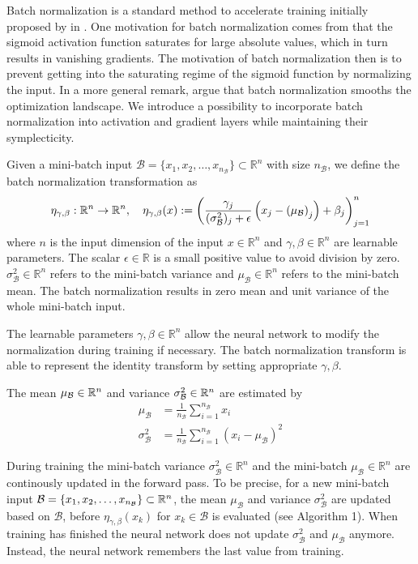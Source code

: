 \documentclass[twoside,a4paper]{article}
\begin{document}
Batch normalization is a standard method to accelerate training initially proposed by
\citeauthor{batchnorm-ioffe15} in \cite{batchnorm-ioffe15}.
One motivation for batch normalization comes from that the sigmoid activation function saturates 
for large absolute values, which in turn results in vanishing gradients. The motivation of batch
normalization then is to prevent getting into the saturating regime of the sigmoid function
by normalizing the input. In a more general remark, \citet{Santurkar2018} argue that
batch normalization smooths the optimization landscape.
We introduce a possibility to incorporate batch normalization
into activation and gradient layers while maintaining their symplecticity.

Given a mini-batch input $\mathcal{B} = \{  x_1, x_2, \dots, x_{n_{\mathcal{B}}} \} \subset \mathbb{R}^{n}$ 
with size $n_{\mathcal{B}}$, we define the batch normalization transformation as
\begin{equation*}
	\eta_{\gamma, \beta} : \mathbb{R}^n \to \mathbb{R}^n,\quad
	\eta_{\gamma, \beta}(x) 
	:= \left( \frac{\gamma_j}{(\sigma^2_\mathcal{B})_j + \epsilon} 
	\left( x_j - \left( \mu_\mathcal{B} \right)_j \right) + \beta_j \right)_{j=1}^n
\end{equation*}
where $n$ is the input dimension of the input $x \in \mathbb{R}^n$ and $\gamma, \beta \in \mathbb{R}^{n}$ 
are learnable parameters.
The scalar $\epsilon \in \mathbb{R}$ is a small positive value to avoid division by zero.
$\sigma^2_\mathcal{B} \in \mathbb{R}^{n}$ refers to the mini-batch variance and
$\mu_\mathcal{B} \in \mathbb{R}^{n}$ refers to the mini-batch mean. The batch normalization results 
in zero mean and unit variance of the whole mini-batch input.

The learnable parameters $\gamma, \beta \in \mathbb{R}^{n}$ allow the neural network to modify
the normalization during training if necessary. The batch normalization transform is able to 
represent the identity transform by setting appropriate $\gamma, \beta$.

The mean $\mu_\mathcal{B} \in \mathbb{R}^n$ and variance $\sigma^2_\mathcal{B} \in \mathbb{R}^n$ are estimated by
\begin{align*}
	\mu_\mathcal{B} &= \frac{1}{n_{\mathcal{B}}} \sum_{i=1}^{n_{\mathcal{B}}} x_i \\
	\sigma^2_\mathcal{B} &= \frac{1}{n_{\mathcal{B}}} 
	\sum_{i=1}^{n_{\mathcal{B}}} (x_i - \mu_\mathcal{B})^2
\end{align*}

During training the mini-batch variance $\sigma^2_\mathcal{B} \in \mathbb{R}^{n}$ and
the mini-batch $\mu_\mathcal{B} \in \mathbb{R}^{n}$ are continously updated in the forward pass.
To be precise, for a new mini-batch input
$\mathcal{B} = \{ x_1, x_2, \dots, x_{n_{\mathcal{B}}} \} \subset \mathbb{R}^n$, 
the mean $\mu_\mathcal{B}$ and variance $\sigma^2_\mathcal{B}$
are updated based on $\mathcal{B}$, before $\eta_{\gamma, \beta}(x_k)$ for
$x_k \in \mathcal{B}$ is evaluated (see Algorithm 1).
When training has finished the neural network does not update $\sigma_\mathcal{B}^2$ 
and $\mu_\mathcal{B}$ anymore. Instead, the neural network remembers the last value from training.
\end{document}
